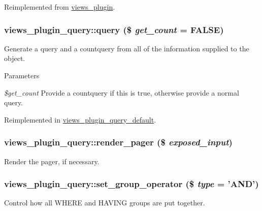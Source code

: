 Reimplemented from \hyperlink{classviews__plugin_a46d72eb35feea36fed83cd1355a47431}{views\_\-plugin}.\hypertarget{classviews__plugin__query_a0609aead46ab39359c4bd5210338e819}{
\subsubsection[{query}]{\setlength{\rightskip}{0pt plus 5cm}views\_\-plugin\_\-query::query (\$ {\em get\_\-count} = {\ttfamily FALSE})}}
\label{classviews__plugin__query_a0609aead46ab39359c4bd5210338e819}
Generate a query and a countquery from all of the information supplied to the object.


\begin{DoxyParams}{Parameters}
\item[{\em \$get\_\-count}]Provide a countquery if this is true, otherwise provide a normal query. \end{DoxyParams}


Reimplemented in \hyperlink{classviews__plugin__query__default_a64cd97fbcd03866806822ef01b9306ff}{views\_\-plugin\_\-query\_\-default}.\hypertarget{classviews__plugin__query_aa5d58adf253ec0eb0621af8ffb8aef02}{
\subsubsection[{render\_\-pager}]{\setlength{\rightskip}{0pt plus 5cm}views\_\-plugin\_\-query::render\_\-pager (\$ {\em exposed\_\-input})}}
\label{classviews__plugin__query_aa5d58adf253ec0eb0621af8ffb8aef02}
Render the pager, if necessary. \hypertarget{classviews__plugin__query_a5ba8dc4bebc3b60cb92206e1862ee196}{
\subsubsection[{set\_\-group\_\-operator}]{\setlength{\rightskip}{0pt plus 5cm}views\_\-plugin\_\-query::set\_\-group\_\-operator (\$ {\em type} = {\ttfamily 'AND'})}}
\label{classviews__plugin__query_a5ba8dc4bebc3b60cb92206e1862ee196}
Control how all WHERE and HAVING groups are put together.


